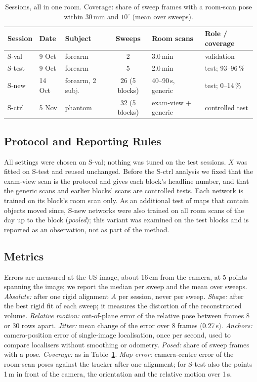 \documentclass[journal]{IEEEtran}
\newcommand{\Sval}{S-val}
\newcommand{\Stest}{S-test}
\newcommand{\Snew}{S-new}
\newcommand{\Sctrl}{S-ctrl}
\begin{document}
\begin{table}[t]
  \caption{Sessions, all in one room. Coverage: share of sweep frames with a room-scan pose within 30\,mm and $10^\circ$ (mean over sweeps).}
  \label{tab:sessions}
  \centering
  \scriptsize
  \setlength{\tabcolsep}{2.5pt}
  \begin{tabular}{@{}lllcll@{}}
    \toprule
    Session & Date & Subject & Sweeps & Room scans & Role / coverage\\
    \midrule
    \Sval & 9 Oct & forearm & 2 & 3.0\,min & validation\\
    \Stest & 9 Oct & forearm & 5 & 2.0\,min & test; 93--96\,\%\\
    \Snew & 14 Oct & forearm, 2 subj. & 26 (5 blocks) & 40--90\,s, generic & test; 0--14\,\%\\
    \Sctrl & 5 Nov & phantom & 32 (5 blocks) & exam-view + generic & controlled test\\
    \bottomrule
  \end{tabular}
\end{table}

\subsection{Protocol and Reporting Rules}
All settings were chosen on \Sval{}; nothing was tuned on the test sessions. $X$ was fitted on \Stest{} and reused unchanged. Before the \Sctrl{} analysis we fixed that the exam-view scan is the protocol and gives each block's headline number, and that the generic scans and earlier blocks' scans are controlled tests. Each network is trained on its block's room scan only. As an additional test of maps that contain objects moved since, \Snew{} networks were also trained on all room scans of the day up to the block (\emph{pooled}); this variant was examined on the test blocks and is reported as an observation, not as part of the method.

\subsection{Metrics}
Errors are measured at the US image, about 16\,cm from the camera, at 5 points spanning the image; we report the median per sweep and the mean over sweeps. \emph{Absolute:} after one rigid alignment $A$ per session, never per sweep. \emph{Shape:} after the best rigid fit of each sweep; it measures the distortion of the reconstructed volume. \emph{Relative motion:} out-of-plane error of the relative pose between frames 8 or 30 rows apart. \emph{Jitter:} mean change of the error over 8 frames (0.27\,s). \emph{Anchors:} camera-position error of single-image localisation, once per second, used to compare localisers without smoothing or odometry. \emph{Posed:} share of sweep frames with a pose. \emph{Coverage:} as in Table~\ref{tab:sessions}. \emph{Map error:} camera-centre error of the room-scan poses against the tracker after one alignment; for \Stest{} also the points 1\,m in front of the camera, the orientation and the relative motion over 1\,s.
\end{document}
